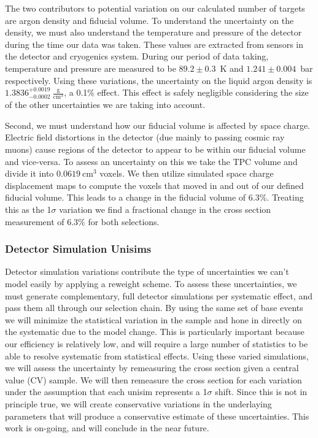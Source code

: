 The two contributors to potential variation on our calculated number of targets are argon density and fiducial volume. To understand the uncertainty on the density, we must also understand the temperature and pressure of the detector during the time our data was taken. These values are extracted from sensors in the detector and cryogenics system. During our period of data taking, temperature and pressure are measured to be $89.2 \pm 0.3$~K and $1.241 \pm 0.004$~bar respectively. Using these variations, the uncertainty on the liquid argon density is $1.3836^{+0.0019}_{-0.0002}~\frac{\text{g}}{\text{cm}^3}$, a 0.1\% effect. This effect is safely negligible considering the size of the other uncertainties we are taking into account.
\par Second, we must understand how our fiducial volume is affected by space charge. Electric field distortions in the detector (due mainly to passing cosmic ray muons) cause regions of the detector to appear to be within our fiducial volume and vice-versa. To assess an uncertainty on this we take the TPC volume and divide it into $0.0619~\text{cm}^3$ voxels. We then utilize simulated space charge displacement maps to compute the voxels that moved in and out of our defined fiducial volume. This leads to a change in the fiducial volume of 6.3\%. Treating this as the 1$\sigma$ variation we find a fractional change in the cross section measurement of 6.3\% for both selections. 



\subsubsection{Detector Simulation Unisims}
Detector simulation variations contribute the type of uncertainties we can't model easily by applying a reweight scheme. To assess these uncertainties, we must generate complementary, full detector simulations per systematic effect, and pass them all through our selection chain. By using the same set of base events we will minimize the statistical variation in the sample and hone in directly on the systematic due to the model change.  This is particularly important because our efficiency is relatively low, and will require a large number of statistics to be able to resolve systematic from statistical effects.  Using these varied simulations, we will assess the uncertainty by remeasuring the cross section given a central value (CV) sample.  We will then remeasure the cross section for each variation under the assumption that each unisim represents a 1$\sigma$ shift. Since this is not in principle true, we will create conservative variations in the underlaying parameters that will produce a conservative estimate of these uncertainties. This work is on-going, and will conclude in the near future. 

